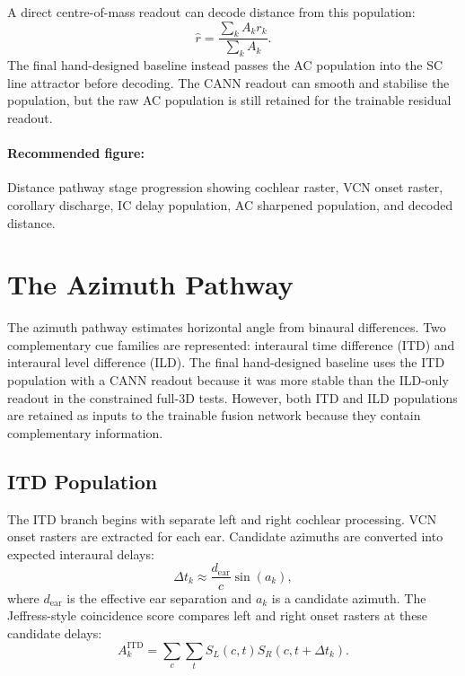 A direct centre-of-mass readout can decode distance from this population:
\begin{equation}
    \hat{r} = \frac{\sum_k A_k r_k}{\sum_k A_k}.
\end{equation}
The final hand-designed baseline instead passes the AC population into the SC line attractor before decoding. The CANN readout can smooth and stabilise the population, but the raw AC population is still retained for the trainable residual readout.

\paragraph{Recommended figure:} Distance pathway stage progression showing cochlear raster, VCN onset raster, corollary discharge, IC delay population, AC sharpened population, and decoded distance.

\section{The Azimuth Pathway}

The azimuth pathway estimates horizontal angle from binaural differences. Two complementary cue families are represented: interaural time difference (ITD) and interaural level difference (ILD). The final hand-designed baseline uses the ITD population with a CANN readout because it was more stable than the ILD-only readout in the constrained full-3D tests. However, both ITD and ILD populations are retained as inputs to the trainable fusion network because they contain complementary information.

\subsection{ITD Population}

The ITD branch begins with separate left and right cochlear processing. VCN onset rasters are extracted for each ear. Candidate azimuths are converted into expected interaural delays:
\begin{equation}
    \Delta t_k \approx \frac{d_{\text{ear}}}{c}\sin(a_k),
\end{equation}
where $d_{\text{ear}}$ is the effective ear separation and $a_k$ is a candidate azimuth. The Jeffress-style coincidence score compares left and right onset rasters at these candidate delays:
\begin{equation}
    A^{\text{ITD}}_k = \sum_c \sum_t S_L(c,t)S_R(c,t+\Delta t_k).
\end{equation}

